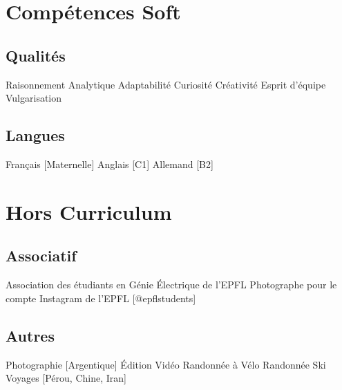 \documentclass{article}
\newcommand{\descript}[1]{\color{darkgray}\normalfont \textbf{#1\\}}
\newcommand{\longdescript}[1]{\color{subheadings}\normalfont\small {#1\\} }
\newcommand{\location}[1]{\color{primary}\headingfont {\hfill #1\\} }
\newcommand{\sectionsep}[0]{\vspace{-6pt}}
\newcommand{\mybullet}[1]{ \hspace{2pt}\textbullet{#1}\hspace{2pt} }
\begin{document}


\section{Compétences Soft}
\subsection{Qualités}
\longdescript{Raisonnement \mybullet{} Analytique \mybullet{} Adaptabilité \mybullet{} Curiosité \mybullet{} Créativité \mybullet{} Esprit d'équipe \mybullet{} Vulgarisation }
\sectionsep
\subsection{Langues}
\longdescript{Français [Maternelle] \mybullet{} Anglais [C1] \mybullet{} Allemand [B2] }
\sectionsep

\section{Hors Curriculum}
\subsection{Associatif}
\longdescript{Association des étudiants en Génie Électrique de l'EPFL \mybullet{} Photographe pour le compte Instagram de l'EPFL [@epflstudents] }
\sectionsep
\subsection{Autres}
\longdescript{Photographie [Argentique] \mybullet{} Édition Vidéo \mybullet{} Randonnée à Vélo \mybullet{} Randonnée \mybullet{} Ski \mybullet{} Voyages [Pérou, Chine, Iran]} 
\sectionsep
\end{document}
